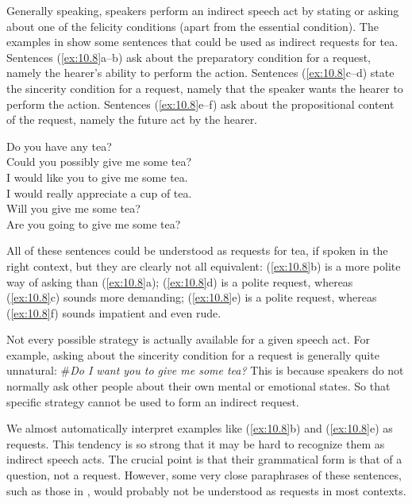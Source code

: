 Generally speaking, speakers perform an indirect speech act by stating or asking about one of the felicity conditions (apart from the essential condition). The examples in  show some sentences that could be used as indirect requests for tea. Sentences (\ref{ex:10.8}a--b) ask about the preparatory condition for a request, namely the hearer’s ability to perform the action. Sentences (\ref{ex:10.8}c--d) state the sincerity condition for a request, namely that the speaker wants the hearer to perform the action. Sentences (\ref{ex:10.8}e--f) ask about the propositional content of the request, namely the future act by the hearer.


\ea \label{ex:10.8}
\ea  Do you have any tea?\\
\ex Could you possibly give me some tea?\\
\ex I would like you to give me some tea.\\
\ex I would really appreciate a cup of tea.\\
\ex Will you give me some tea?\\
\ex Are you going to give me some tea?
                       \z
\z


All of these sentences could be understood as requests for tea, if spoken in the right context, but they are clearly not all equivalent: (\ref{ex:10.8}b) is a more polite way of asking than (\ref{ex:10.8}a); (\ref{ex:10.8}d) is a polite request, whereas (\ref{ex:10.8}c) sounds more demanding; (\ref{ex:10.8}e) is a polite request, whereas (\ref{ex:10.8}f) sounds impatient and even rude.



Not every possible strategy is actually available for a given speech act. For example, asking about the sincerity condition for a request is generally quite unnatural: \#\textit{Do I want you to give me some tea?} This is because speakers do not normally ask other people about their own mental or emotional states. So that specific strategy cannot be used to form an indirect request.



We almost automatically interpret examples like (\ref{ex:10.8}b) and (\ref{ex:10.8}e) as requests. This tendency is so strong that it may be hard to recognize them as indirect speech acts. The crucial point is that their grammatical form is that of a question, not a request. However, some very close paraphrases of these sentences, such as those in , would probably not be understood as requests in most contexts.

